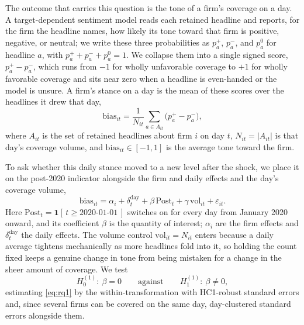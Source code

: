 \documentclass[conference]{IEEEtran}
\begin{document}
The outcome that carries this question is the tone of a firm's coverage on a day. A
target-dependent sentiment model reads each retained headline and reports, for the
firm the headline names, how likely its tone toward that firm is positive, negative,
or neutral; we write these three probabilities as $p^{+}_a$, $p^{-}_a$, and $p^{0}_a$
for headline $a$, with $p^{+}_a + p^{-}_a + p^{0}_a = 1$. We collapse them into a
single signed score, $p^{+}_a - p^{-}_a$, which runs from $-1$ for wholly unfavorable
coverage to $+1$ for wholly favorable coverage and sits near zero when a headline is
even-handed or the model is unsure. A firm's stance on a day is the mean of these
scores over the headlines it drew that day,
\begin{equation}
\text{bias}_{it} = \frac{1}{N_{it}} \sum_{a \in A_{it}} \bigl(p^{+}_a - p^{-}_a\bigr),
\label{eq:bias}
\end{equation}
where $A_{it}$ is the set of retained headlines about firm $i$ on day $t$,
$N_{it} = |A_{it}|$ is that day's coverage volume, and
$\text{bias}_{it} \in [-1,1]$ is the average tone toward the firm.

To ask whether this daily stance moved to a new level after the shock, we place it on
the post-2020 indicator alongside the firm and daily effects and the day's coverage
volume,
\begin{equation}
\text{bias}_{it} = \alpha_i + \delta_t^{\text{day}} + \beta\,\text{Post}_t
+ \gamma\,\text{vol}_{it} + \varepsilon_{it}.
\label{eq:rq1}
\end{equation}
Here $\text{Post}_t = \mathbf{1}[\,t \ge \text{2020-01-01}\,]$ switches on for every day
from January 2020 onward, and its coefficient $\beta$ is the quantity of interest;
$\alpha_i$ are the firm effects and $\delta_t^{\text{day}}$ the daily effects. The
volume control $\text{vol}_{it} = N_{it}$ enters because a daily average tightens
mechanically as more headlines fold into it, so holding the count fixed keeps a
genuine change in tone from being mistaken for a change in the sheer amount of
coverage. We test
\begin{equation*}
H_0^{(1)}:\ \beta = 0 \qquad\text{against}\qquad H_1^{(1)}:\ \beta \neq 0,
\end{equation*}
estimating \eqref{eq:rq1} by the within-transformation with HC1-robust standard
errors and, since several firms can be covered on the same day, day-clustered standard
errors alongside them.
\end{document}
